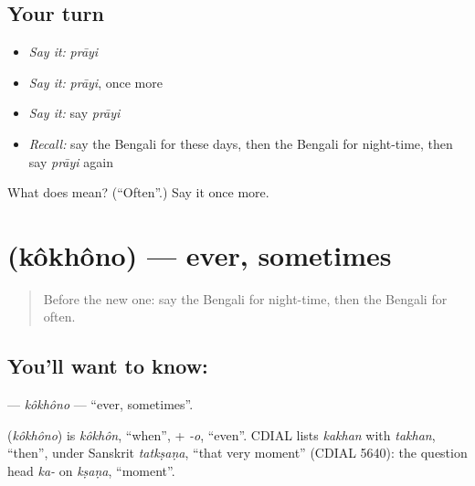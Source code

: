 \subsection*{Your turn}
\begin{itemize}
\raggedright
  \item \emph{Say it:} \emph{prāyi}
  \item \emph{Say it:} \emph{prāyi}, once more
  \item \emph{Say it:} say \emph{prāyi}
  \item \emph{Recall:} say the Bengali for these days, then the Bengali for night-time, then say \emph{prāyi} again
\end{itemize}

\begin{tcolorbox}[breakable,colback=teal!4,colframe=teal!35!black,title={Before you move on}]
What does  mean? (\textquotedblleft{}Often\textquotedblright{}.) Say it once more.
\end{tcolorbox}
\section[\texorpdfstring{\bn{কখনো} (kôkhôno)}{কখনো (kôkhôno)}]{ (kôkhôno) — ever, sometimes}

\label{lesson:BN-C94-kokhono}



\begin{quote}
Before the new one: say the Bengali for night-time, then the Bengali for often.
\end{quote}

\subsection*{You'll want to know: }
\textbf{} — \emph{kôkhôno} — \textquotedblleft{}ever, sometimes\textquotedblright{}.

\begin{cousinweb}
\textbf{} (\emph{kôkhôno}) is \emph{kôkhôn}, \textquotedblleft{}when\textquotedblright{}, + \emph{-o}, \textquotedblleft{}even\textquotedblright{}. CDIAL lists \emph{kakhan} with \emph{takhan}, \textquotedblleft{}then\textquotedblright{}, under Sanskrit \emph{tatkṣaṇa}, \textquotedblleft{}that very moment\textquotedblright{} (CDIAL 5640): the question head \emph{ka-} on \emph{kṣaṇa}, \textquotedblleft{}moment\textquotedblright{}.
\end{cousinweb}

